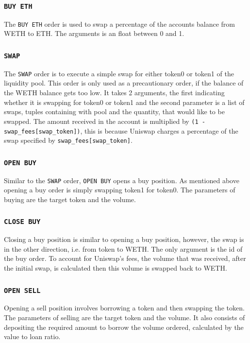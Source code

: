 \subsubsection{\texttt{BUY\ ETH}}
The \texttt{BUY\ ETH} order is used to swap a percentage of the accounts balance from WETH to ETH. The arguments is an float between 0 and 1.

\subsubsection{\texttt{SWAP}}
The \texttt{SWAP} order is to execute a simple swap for either token0 or token1 of the liquidity pool. This order is only used as a precautionary order, if the balance of the WETH balance gets too low. It takes 2 arguments, the first indicating whether it is swapping for token0 or token1 and the second parameter is a list of swaps, tuples containing with pool and the quantity, that would like to be swapped. The amount received in the account is multiplied by \texttt{(1 - swap\_fees[swap\_token])}, this is because Uniswap charges a percentage of the swap specified by \texttt{swap\_fees[swap\_token]}.

\subsubsection{\texttt{OPEN\ BUY}}
Similar to the \texttt{SWAP} order, \texttt{OPEN\ BUY} opens a buy position. As mentioned above opening a buy order is simply swapping token1 for token0. The parameters of buying are the target token and the volume. 

\subsubsection{\texttt{CLOSE\ BUY}}
Closing a buy position is similar to opening a buy position, however, the swap is in the other direction, i.e. from token to WETH. The only argument is the id of the buy order. To account for Uniswap's fees, the volume that was received, after the initial swap, is calculated then this volume is swapped back to WETH.

\subsubsection{\texttt{OPEN\ SELL}}
Opening a sell position involves borrowing a token and then swapping the token. The parameters of selling are the target token and the volume. It also consists of depositing the required amount to borrow the volume ordered, calculated by the value to loan ratio.

